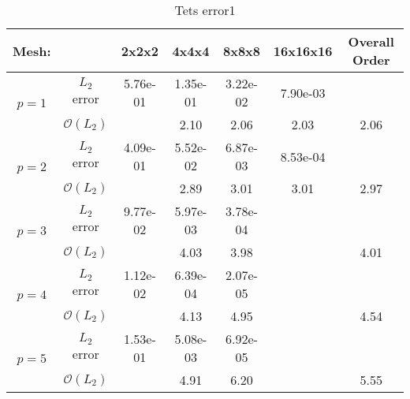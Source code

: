 \begin{table}[h]
\centering
\begin{tabular}{ c c c c c c c} 
  
 Mesh: &   & 2x2x2 & 4x4x4 & 8x8x8 & 16x16x16 & Overall Order \\ 
 \hline 
 \multirow{2}{*}{$p = 1$} & $L_2$ error & 5.76e-01 & 1.35e-01 & 3.22e-02 & 7.90e-03 &   \\ 
  
   & $\mathcal{O}(L_2)$ &   & 2.10 & 2.06 & 2.03 & 2.06 \\ 
 \hline 
 \multirow{2}{*}{$p = 2$} & $L_2$ error & 4.09e-01 & 5.52e-02 & 6.87e-03 & 8.53e-04 &   \\ 
  
   & $\mathcal{O}(L_2)$ &   & 2.89 & 3.01 & 3.01 & 2.97 \\ 
 \hline 
 \multirow{2}{*}{$p = 3$} & $L_2$ error & 9.77e-02 & 5.97e-03 & 3.78e-04 &   &   \\ 
  
   & $\mathcal{O}(L_2)$ &   & 4.03 & 3.98 &   & 4.01 \\ 
 \hline 
 \multirow{2}{*}{$p = 4$} & $L_2$ error & 1.12e-02 & 6.39e-04 & 2.07e-05 &   &   \\ 
  
   & $\mathcal{O}(L_2)$ &   & 4.13 & 4.95 &   & 4.54 \\ 
 \hline 
 \multirow{2}{*}{$p = 5$} & $L_2$ error & 1.53e-01 & 5.08e-03 & 6.92e-05 &   &   \\ 
  
   & $\mathcal{O}(L_2)$ &   & 4.91 & 6.20 &   & 5.55 \\ 
 \hline 
 \end{tabular}
\caption{Tets error1} 
 \end{table}
